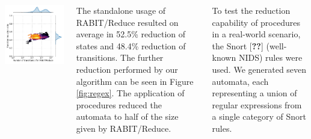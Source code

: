 \documentclass[25pt, a1paper, portrait]{tikzposter}
\begin{document}
\begin{columns}
{\begin{tikzfigure}
\begin{minipage}{0.21\textwidth}
                \includegraphics[width=1\linewidth]{images/intersect-all-trans.pdf}
            \end{minipage}
            \label{fig:regex}
        \end{tikzfigure}

        The standalone usage of RABIT/Reduce resulted on average in 52.5\% reduction of states and 48.4\% reduction of transitions. The further reduction performed by our algorithm can be seen in Figure \ref{fig:regex}. The application of procedures reduced the automata to half of the size given by RABIT/Reduce.
    }
     {
        To test the reduction capability of procedures in a real-world scenario, the Snort [\textbf{??}] (well-known NIDS) rules were used. We generated seven automata, each representing a union of regular expressions from a single category of Snort rules.

}
\end{columns}
\end{document}
